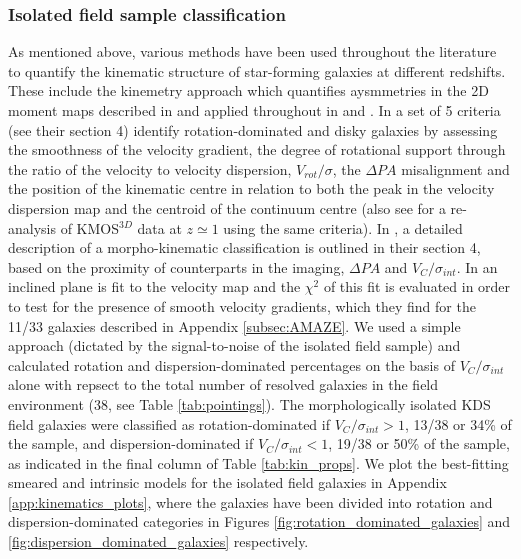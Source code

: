 \documentclass[fleqn,usenatbib]{mnras}
\begin{document}
\subsubsection{Isolated field sample classification}\label{subsubsection:isolated_classification}
As mentioned above, various methods have been used throughout the literature to quantify the kinematic structure of star-forming galaxies at different redshifts. 
These include the kinemetry approach which quantifies aysmmetries in the 2D moment maps described in \cite{Shapiro2008} and applied throughout in \cite{ForsterSchreiber2009} and \cite{Cresci2009}.
In \cite{Wisnioski2015} a set of 5 criteria (see their section 4) identify rotation-dominated and disky galaxies by assessing the smoothness of the velocity gradient, the degree of rotational support through the ratio of the velocity to velocity dispersion, $V_{rot}/\sigma$, the $\Delta PA$ misalignment and the position of the kinematic centre in relation to both the peak in the velocity dispersion map and the centroid of the continuum centre (also see \citealt{Rodrigues2017} for a re-analysis of KMOS$^{3D}$ data at $z\simeq1$ using the same criteria).   
In \cite{Epinat2012}, a detailed description of a morpho-kinematic classification is outlined in their section 4, based on the proximity of counterparts in the imaging, $\Delta PA$ and $V_{C}/\sigma_{int}$.
In \cite{Gnerucci2011} an inclined plane is fit to the velocity map and the $\chi^{2}$ of this fit is evaluated in order to test for the presence of smooth velocity gradients, which they find for the 11/33 galaxies described in Appendix \ref{subsec:AMAZE}.
We used a simple approach (dictated by the signal-to-noise of the isolated field sample) and calculated rotation and dispersion-dominated percentages on the basis of $V_{C}/\sigma_{int}$ alone with repsect to the total number of resolved galaxies in the field environment (38, see Table \ref{tab:pointings}).
The morphologically isolated KDS field galaxies were classified as rotation-dominated if $V_{C}/\sigma_{int} > 1$, 13/38 or 34\% of the sample, and dispersion-dominated if $V_{C}/\sigma_{int} < 1$, 19/38 or 50\% of the sample, as indicated in the final column of Table \ref{tab:kin_props}.
We plot the best-fitting smeared and intrinsic models for the isolated field galaxies in Appendix \ref{app:kinematics_plots}, where the galaxies have been divided into rotation and dispersion-dominated categories in Figures \ref{fig:rotation_dominated_galaxies} and \ref{fig:dispersion_dominated_galaxies} respectively.
\end{document}
